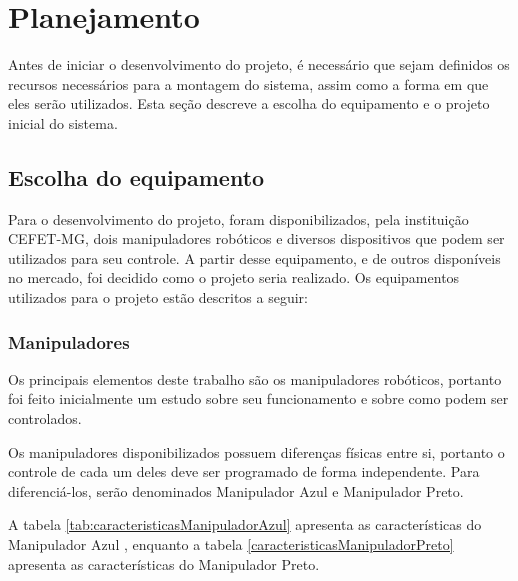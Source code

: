 \chapter[Planejamento]{Planejamento}
\label{cap:planejamento}

Antes de iniciar o desenvolvimento do projeto, é necessário que sejam definidos os recursos necessários para a montagem do sistema, assim como a forma em que eles serão utilizados.
Esta seção descreve a escolha do equipamento e o projeto inicial do sistema.

\section[Escolha do equipamento]{Escolha do equipamento}

Para o desenvolvimento do projeto, foram disponibilizados, pela instituição CEFET-MG, dois manipuladores robóticos e diversos dispositivos que podem ser utilizados para seu controle.
A partir desse equipamento, e de outros disponíveis no mercado, foi decidido como o projeto seria realizado.
Os equipamentos utilizados para o projeto estão descritos a seguir:

\subsection[Manipuladores]{Manipuladores}

Os principais elementos deste trabalho são os manipuladores robóticos, portanto foi feito inicialmente um estudo sobre seu funcionamento e sobre como podem ser controlados.

Os manipuladores disponibilizados possuem diferenças físicas entre si, portanto o controle de cada um deles deve ser programado de forma independente.
Para diferenciá-los, serão denominados Manipulador Azul e Manipulador Preto.

A tabela \ref{tab:caracteristicasManipuladorAzul} apresenta as características do Manipulador Azul \cite{mentor_forward_kinematics}, enquanto a tabela \ref{caracteristicasManipuladorPreto} apresenta as características do Manipulador Preto.

